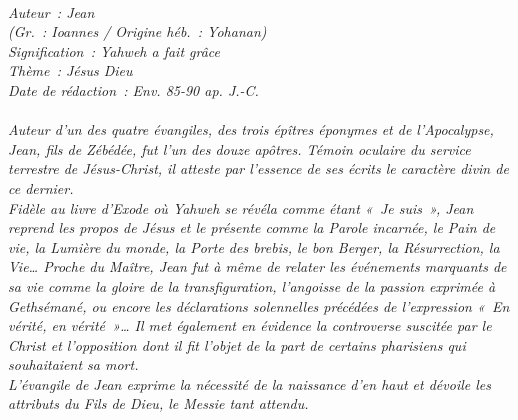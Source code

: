\BFont
\noindent\hrulefill
{\footnotesize
\textit{
\bigskip
{\centering{}
\\Auteur~: Jean
\\(Gr.~: Ioannes / Origine héb.~: Yohanan)
\\Signification~: Yahweh a fait grâce
\\Thème~: Jésus Dieu
\\Date de rédaction~: Env. 85-90 ap. J.-C.\\}
}
\textit{
\\Auteur d'un des quatre évangiles, des trois épîtres éponymes et de l'Apocalypse, Jean, fils de Zébédée, fut l'un des douze apôtres. Témoin oculaire du service terrestre de Jésus-Christ, il atteste par l'essence de ses écrits le caractère divin de ce dernier.
\\Fidèle au livre d'Exode où Yahweh se révéla comme étant «~Je suis~», Jean reprend les propos de Jésus et le présente comme la Parole incarnée, le Pain de vie, la Lumière du monde, la Porte des brebis, le bon Berger, la Résurrection, la Vie… Proche du Maître, Jean fut à même de relater les événements marquants de sa vie comme la gloire de la transfiguration, l'angoisse de la passion exprimée à Gethsémané, ou encore les déclarations solennelles précédées de l'expression «~En vérité, en vérité~»… Il met également en évidence la controverse suscitée par le Christ et l'opposition dont il fit l'objet de la part de certains pharisiens qui souhaitaient sa mort.
\\L'évangile de Jean exprime la nécessité de la naissance d'en haut et dévoile les attributs du Fils de Dieu, le Messie tant attendu.\bigskip
}
}
\par\nobreak\noindent\hrulefill
